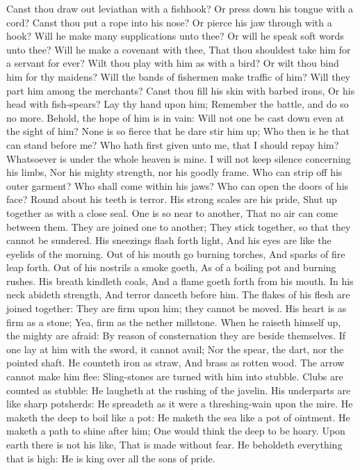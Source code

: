 Canst thou draw out leviathan with a fishhook? Or press down his tongue with a cord?  Canst thou put a rope into his nose? Or pierce his jaw through with a hook?  Will he make many supplications unto thee? Or will he speak soft words unto thee?  Will he make a covenant with thee, That thou shouldest take him for a servant for ever?  Wilt thou play with him as with a bird? Or wilt thou bind him for thy maidens?  Will the bands of fishermen make traffic of him? Will they part him among the merchants?  Canst thou fill his skin with barbed irons, Or his head with fish-spears?  Lay thy hand upon him; Remember the battle, and do so no more.  Behold, the hope of him is in vain: Will not one be cast down even at the sight of him?  None is so fierce that he dare stir him up; Who then is he that can stand before me?  Who hath first given unto me, that I should repay him? Whatsoever is under the whole heaven is mine.  I will not keep silence concerning his limbs, Nor his mighty strength, nor his goodly frame.  Who can strip off his outer garment? Who shall come within his jaws?  Who can open the doors of his face? Round about his teeth is terror.  His strong scales are his pride, Shut up together as with a close seal.  One is so near to another, That no air can come between them.  They are joined one to another; They stick together, so that they cannot be sundered.  His sneezings flash forth light, And his eyes are like the eyelids of the morning.  Out of his mouth go burning torches, And sparks of fire leap forth.  Out of his nostrils a smoke goeth, As of a boiling pot and burning rushes.  His breath kindleth coals, And a flame goeth forth from his mouth.  In his neck abideth strength, And terror danceth before him.  The flakes of his flesh are joined together: They are firm upon him; they cannot be moved.  His heart is as firm as a stone; Yea, firm as the nether millstone.  When he raiseth himself up, the mighty are afraid: By reason of consternation they are beside themselves.  If one lay at him with the sword, it cannot avail; Nor the spear, the dart, nor the pointed shaft.  He counteth iron as straw, And brass as rotten wood.  The arrow cannot make him flee: Sling-stones are turned with him into stubble.  Clubs are counted as stubble: He laugheth at the rushing of the javelin.  His underparts are like sharp potsherds: He spreadeth as it were a threshing-wain upon the mire.  He maketh the deep to boil like a pot: He maketh the sea like a pot of ointment.  He maketh a path to shine after him; One would think the deep to be hoary.  Upon earth there is not his like, That is made without fear.  He beholdeth everything that is high: He is king over all the sons of pride. 

